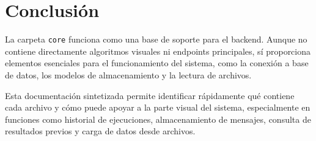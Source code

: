 \documentclass[12pt]{article}
\begin{document}
	\section{Conclusión}
	
	La carpeta \texttt{core} funciona como una base de soporte para el backend. Aunque no contiene directamente algoritmos visuales ni endpoints principales, sí proporciona elementos esenciales para el funcionamiento del sistema, como la conexión a base de datos, los modelos de almacenamiento y la lectura de archivos.
	
	Esta documentación sintetizada permite identificar rápidamente qué contiene cada archivo y cómo puede apoyar a la parte visual del sistema, especialmente en funciones como historial de ejecuciones, almacenamiento de mensajes, consulta de resultados previos y carga de datos desde archivos.
	
\end{document}
